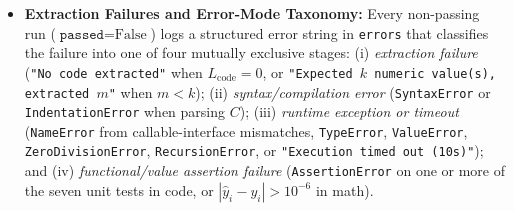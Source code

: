 \documentclass[a4paper,fleqn]{cas-sc}
\begin{document}
\begin{itemize}
\item \textbf{Extraction Failures and Error-Mode Taxonomy:} Every non-passing run ($\texttt{passed} = \text{False}$) logs a structured error string in \texttt{errors} that classifies the failure into one of four mutually exclusive stages: (i) \emph{extraction failure} (\texttt{"No code extracted"} when $L_{\text{code}} = 0$, or \texttt{"Expected $k$ numeric value(s), extracted $m$"} when $m < k$); (ii) \emph{syntax/compilation error} (\texttt{SyntaxError} or \texttt{IndentationError} when parsing $C$); (iii) \emph{runtime exception or timeout} (\texttt{NameError} from callable-interface mismatches, \texttt{TypeError}, \texttt{ValueError}, \texttt{ZeroDivisionError}, \texttt{RecursionError}, or \texttt{"Execution timed out (10s)"}); and (iv) \emph{functional/value assertion failure} (\texttt{AssertionError} on one or more of the seven unit tests in code, or $|\hat{y}_i - y_i| > 10^{-6}$ in math).
\end{itemize}
\end{document}
